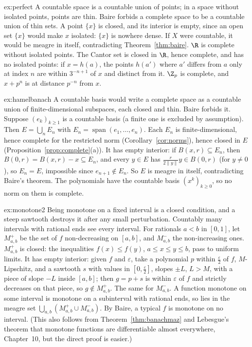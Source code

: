 \begin{solution}{ex:perfect}
\idea A countable space is a countable union of points; in a space without isolated points, points are thin. Baire forbids a complete space to
be a countable union of thin sets.
\writeup A point $\{x\}$ is closed, and its interior is empty, since an open set $\{x\}$ would make $x$ isolated: $\{x\}$ is nowhere dense. If $X$ were countable, it
would be meagre in itself, contradicting Theorem~\ref{thm:baire}. $\R$ is complete without isolated points. The Cantor set is closed in $\R$, hence complete,
and has no isolated points: if $x=h(a)$, the points $h(a')$ where $a'$ differs from $a$ only at index $n$ are within $3^{-n+1}$ of $x$ and distinct from it. $\Z_p$ is complete, and
$x+p^n$ is at distance $p^{-n}$ from $x$.
\end{solution}

\begin{solution}{ex:hamelbanach}
\idea A countable basis would write a complete space as a countable union of finite-dimensional subspaces, each closed and thin. Baire forbids
it.
\writeup Suppose $(e_k)_{k\ge1}$ is a countable basis (a finite one is excluded by assumption). Then $E=\bigcup_nE_n$ with $E_n=\operatorname{span}(e_1,\dots,e_n)$. Each $E_n$ is
finite-dimensional, hence complete for the restricted norm (Corollary~\ref{cor:norms}), hence closed in $E$ (Proposition~\ref{prop:complete}(a)). It has empty interior: if
$B(x,r)\subseteq E_n$, then $B(0,r)=B(x,r)-x\subseteq E_n$, and every $y\in E$ has $\frac r{2\|y\|}y\in B(0,r)$ (for $y\ne0$), so $E_n=E$, impossible since $e_{n+1}\notin E_n$. So $E$ is meagre in itself,
contradicting Baire's theorem. The polynomials have the countable basis $(x^k)_{k\ge0}$, so no norm on them is complete.
\end{solution}

\begin{solution}{ex:monotone2}
\idea Being monotone on a fixed interval is a closed condition, and a steep sawtooth destroys it after any small perturbation. Countably many
intervals with rational ends see every interval.
\writeup For rationals $a<b$ in $[0,1]$, let $M^+_{a,b}$ be the set of $f$ non-decreasing on $[a,b]$, and $M^-_{a,b}$ the non-increasing ones. $M^+_{a,b}$ is closed: the inequalities
$f(x)\le f(y)$, $a\le x\le y\le b$, pass to uniform limits. It has empty interior: given $f$ and $\varepsilon$, take a polynomial $p$ within $\frac\varepsilon2$ of $f$, $M$-Lipschitz, and a
sawtooth $s$ with values in $[0,\frac\varepsilon2]$, slopes $\pm L$, $L>M$, with a piece of slope $-L$ inside $[a,b]$; then $g=p+s$ is within $\varepsilon$ of $f$ and strictly decreases on that piece, so
$g\notin M^+_{a,b}$. The same for $M^-_{a,b}$. A function monotone on some interval is monotone on a subinterval with rational ends, so lies in the meagre set
$\bigcup_{a,b}(M^+_{a,b}\cup M^-_{a,b})$. By Baire, a typical $f$ is monotone on no interval. (This also follows from Theorem~\ref{thm:banachmaz} and Lebesgue's theorem that
monotone functions are differentiable almost everywhere, Chapter~10, but the direct proof is easier.)
\end{solution}

